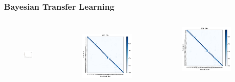 \documentclass[10pt,a4paper]{beamer}
\begin{document}
\begin{frame}\frametitle{Bayesian Transfer Learning}
	\begin{columns}[T]
	\begin{figure}
		\includegraphics[width=\textwidth,height=3cm]{results/sgd_losloss}
	\end{figure}
	\begin{figure}
		\includegraphics[width=\textwidth]{results/plants_confusion_matrix_sgd_cpu}
		\label{fig:sgd_cpu_performance}
	\end{figure}
	\begin{figure}
		\includegraphics[width=\textwidth]{results/plants_confusion_matrix_sgd_gpu}

\end{figure}
\end{columns}
\end{frame}
\end{document}
